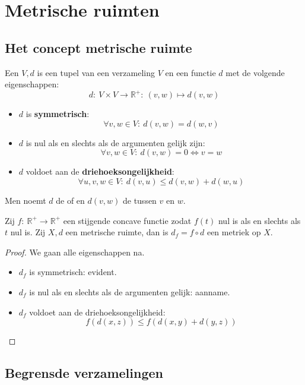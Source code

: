 \documentclass[main.tex]{subfiles}
\begin{document}
\section{Metrische ruimten}
\label{sec:metrische-ruimten}

\subsection{Het concept metrische ruimte}
\label{sec:het-conc-metr}

\begin{de}
  Een  $V,d$ is een tupel van een verzameling $V$ en een functie $d$ met de volgende eigenschappen:
  \[ d:\ V \times V \rightarrow \mathbb{R}^{+}:\ (v,w) \mapsto d(v,w) \]
  \begin{itemize}
  \item $d$ is \textbf{symmetrisch}:
    \[ \forall v,w \in V:\ d(v,w) = d(w,v) \]
  \item $d$ is nul als en slechts als de argumenten gelijk zijn:
    \[ \forall v,w \in V:\ d(v,w) = 0 \Leftrightarrow v = w \]
  \item $d$ voldoet aan de \textbf{driehoeksongelijkheid}:
    \[ \forall u,v,w \in V:\ d(v,u) \le d(v,w) + d(w,u) \]
  \end{itemize}
  Men noemt $d$ de  of  en $d(v,w)$ de  tussen $v$ en $w$.
\end{de}


\begin{st}
  Zij $f:\ \mathbb{R}^{+} \rightarrow \mathbb{R}^{+}$ een stijgende concave functie zodat $f(t)$ nul is als en slechts als $t$ nul is.
  Zij $X,d$ een metrische ruimte, dan is $d_{f} = f\circ d$ een metriek op $X$.

  \begin{proof}
    We gaan alle eigenschappen na.
    \begin{itemize}
    \item $d_{f}$ is symmetrisch: evident.
    \item $d_{f}$ is nul als en slechts als de argumenten gelijk: aanname.
    \item $d_{f}$ voldoet aan de driehoeksongelijkheid:
      \[ f(d(x,z)) \le f(d(x,y) + d(y,z)) \]
    \end{itemize}
  \end{proof}
\end{st}

\subsection{Begrensde verzamelingen}
\label{sec:begr-verz}
\end{document}
